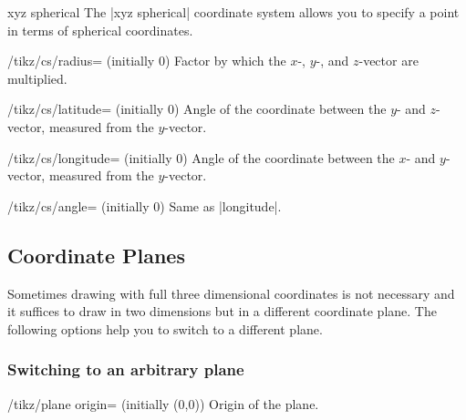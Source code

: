 \begin{coordinatesystem}{xyz spherical}
    The |xyz spherical| coordinate system allows you to specify a point in
    terms of spherical coordinates.
    \begin{key}{/tikz/cs/radius= (initially 0)}
        Factor by which the $x$-, $y$-, and $z$-vector are multiplied.
    \end{key}
    \begin{key}{/tikz/cs/latitude= (initially 0)}
        Angle of the coordinate between the $y$- and $z$-vector, measured from
        the $y$-vector.
    \end{key}
    \begin{key}{/tikz/cs/longitude= (initially 0)}
        Angle of the coordinate between the $x$- and $y$-vector, measured from
        the $y$-vector.
    \end{key}
    \begin{key}{/tikz/cs/angle= (initially 0)}
        Same as |longitude|.
    \end{key}
\begin{codeexample}[preamble={\usetikzlibrary{3d}}]
\end{codeexample}
\end{coordinatesystem}


\subsection{Coordinate Planes}

Sometimes drawing with full three dimensional coordinates is not necessary and
it suffices to draw in two dimensions but in a different coordinate plane.  The
following options help you to switch to a different plane.


\subsubsection{Switching to an arbitrary plane}

\begin{key}{/tikz/plane origin= (initially {(0,0)})}
    Origin of the plane.
\end{key}

